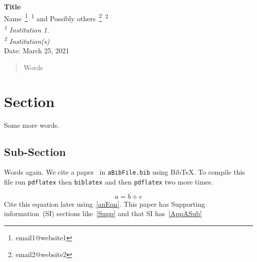 %




\begin{center}
{\bf Title} \bsk\\
    Name~\footnote{email1@website1}~\textsuperscript{1} 
    and Possibly others~\footnote{email2@website2}~\textsuperscript{2}\\
{\em \textsuperscript{1} Institution 1.}\\
{\em \textsuperscript{2} Institution(s)}\\
Date: March 25, 2021
\end{center}

\begin{abstract}
Words
\end{abstract}

\section{Section}
\label{Label1}
\xb
{}
\xa

Some more words.

\subsection{Sub-Section}
\label{Label2}
\xb
{}
\xa

Words again. We cite a paper~\cite{AuthorYear} in {\tt aBibFile.bib} using
BibTeX. To compile this file run {\tt pdflatex} then {\tt biblatex} and
then {\tt pdflatex} two more times.

\begin{equation}
    a = b + c
    \label{anEqn}
\end{equation}
%
Cite this equation later using~\eqref{anEqn}. This paper has Supporting
information~(SI) sections like~\ref{Supp} and that SI has~\ref{AppASub}






